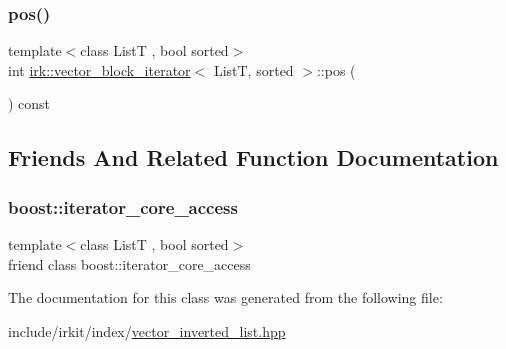 \subsubsection{\texorpdfstring{pos()}{pos()}}
{\footnotesize\ttfamily template$<$class ListT , bool sorted$>$ \\
int \mbox{\hyperlink{classirk_1_1vector__block__iterator}{irk\+::vector\+\_\+block\+\_\+iterator}}$<$ ListT, sorted $>$\+::pos (\begin{DoxyParamCaption}{ }\end{DoxyParamCaption}) const\hspace{0.3cm}{\ttfamily [inline]}}



\subsection{Friends And Related Function Documentation}
\mbox{\label{classirk_1_1vector__block__iterator_ac09f73e325921cc50ebcd96bed0f8096}} 
\subsubsection{\texorpdfstring{boost\+::iterator\+\_\+core\+\_\+access}{boost::iterator\_core\_access}}
{\footnotesize\ttfamily template$<$class ListT , bool sorted$>$ \\
friend class boost\+::iterator\+\_\+core\+\_\+access\hspace{0.3cm}{\ttfamily [friend]}}



The documentation for this class was generated from the following file\+:\begin{DoxyCompactItemize}
\item 
include/irkit/index/\mbox{\hyperlink{vector__inverted__list_8hpp}{vector\+\_\+inverted\+\_\+list.\+hpp}}\end{DoxyCompactItemize}

